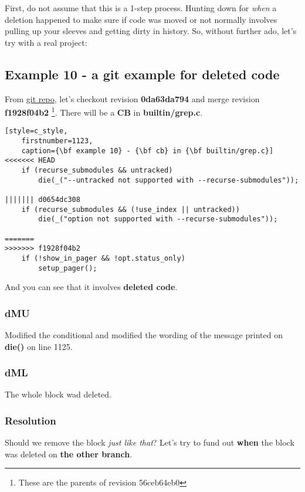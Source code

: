 First, do not assume that this is a 1-step process. Hunting down for {\it when} a deletion happened to make
sure if code was moved or not normally involves pulling up your sleeves and getting dirty in history. So, without
further ado, let's try with a real project:

\subsection{Example 10 - a git example for deleted code}
\label{example_10}

From \href{git_repo}{git repo}, let's checkout revision {\bf 0da63da794} and merge revision {\bf f1928f04b2}
\footnote{These are the parents of revision 56ceb64eb0}. There will be a {\bf CB} in {\bf builtin/grep.c}.

\begin{lstlisting}[style=c_style,
	firstnumber=1123,
	caption={\bf example 10} - {\bf cb} in {\bf builtin/grep.c}]
<<<<<<< HEAD
	if (recurse_submodules && untracked)
		die(_("--untracked not supported with --recurse-submodules"));

||||||| d0654dc308
	if (recurse_submodules && (!use_index || untracked))
		die(_("option not supported with --recurse-submodules"));

=======
>>>>>>> f1928f04b2
	if (!show_in_pager && !opt.status_only)
		setup_pager();
\end{lstlisting}

And you can see that it involves {\bf deleted code}.

\subsubsection{dMU}
Modified the conditional and modified the wording of the message printed on {\bf die()} on line 1125.

\subsubsection{dML}
The whole block wad deleted.

\subsubsection{Resolution}
Should we remove the block {\it just like that}? Let's try to fund out {\bf when} the block was deleted on {\bf the other branch}.

